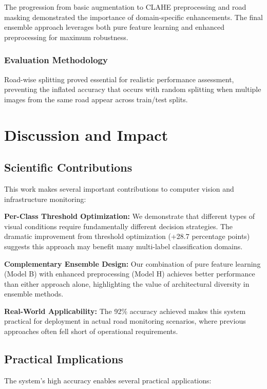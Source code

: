 \documentclass[12pt]{article}
\begin{document}
The progression from basic augmentation to CLAHE preprocessing and road masking demonstrated the importance of domain-specific enhancements. The final ensemble approach leverages both pure feature learning and enhanced preprocessing for maximum robustness.

\subsubsection{Evaluation Methodology}

Road-wise splitting proved essential for realistic performance assessment, preventing the inflated accuracy that occurs with random splitting when multiple images from the same road appear across train/test splits.

\section{Discussion and Impact}

\subsection{Scientific Contributions}

This work makes several important contributions to computer vision and infrastructure monitoring:

\textbf{Per-Class Threshold Optimization:} We demonstrate that different types of visual conditions require fundamentally different decision strategies. The dramatic improvement from threshold optimization (+28.7 percentage points) suggests this approach may benefit many multi-label classification domains.

\textbf{Complementary Ensemble Design:} Our combination of pure feature learning (Model B) with enhanced preprocessing (Model H) achieves better performance than either approach alone, highlighting the value of architectural diversity in ensemble methods.

\textbf{Real-World Applicability:} The 92\% accuracy achieved makes this system practical for deployment in actual road monitoring scenarios, where previous approaches often fell short of operational requirements.

\subsection{Practical Implications}

The system's high accuracy enables several practical applications:
\end{document}
